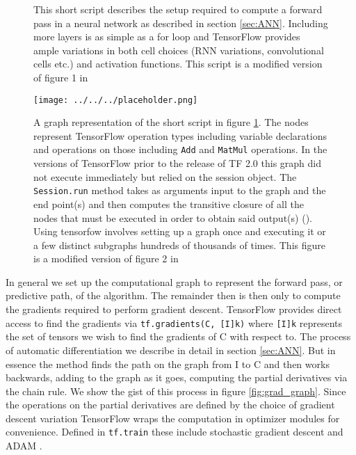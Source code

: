 \begin{figure}[H]
\centering

\caption[FCN forward pass in TensorFlow]{This short script describes the setup required to compute a forward pass in a neural network as described in section \ref{sec:ANN}. Including more layers is as simple as a for loop and TensorFlow provides ample variations in both cell choices (RNN variations, convolutional cells etc.) and activation functions. This script is a modified version of figure 1 in \cite{tensorflow}}\label{fig:graph}
\end{figure}
\begin{figure}
\texttt{[image: ../../../placeholder.png]}
\caption[Graph representation of the forward pass of a simple FCN]{A graph representation of the short script in figure \ref{fig:graph}. The nodes represent TensorFlow operation types including variable declarations and operations on those including \lstinline{Add} and \lstinline{MatMul} operations. In the versions of TensorFlow prior to the release of TF 2.0 this graph did not execute immediately but relied on the session object. The \lstinline{Session.run} method takes as arguments input to the graph and the end point(s) and then computes the transitive closure of all the nodes that must be executed in order to obtain said output(s) (\cite{tensorflow}). Using tensorfow involves setting up a graph once and executing it or a few distinct subgraphs hundreds of thousands of times. This figure is a modified version of figure 2 in \citet{tensorflow}}
\end{figure}

In general we set up the computational graph to represent the forward pass, or predictive path, of the algorithm. The remainder then is then only to compute the gradients required to perform gradient descent. TensorFlow provides direct access to find the gradients via \lstinline{tf.gradients(C, [I]k)} where \lstinline{[I]k} represents the set of tensors we wish to find the gradients of C with respect to. The process of automatic differentiation we describe in detail in section \ref{sec:ANN}. But in essence the method finds the path on the graph from I to C and then works backwards, adding to the graph as it goes, computing the partial derivatives via the chain rule. We show the gist of this process in figure \ref{fig:grad_graph}. Since the operations on the partial derivatives are defined by the choice of gradient descent variation TensorFlow wraps the computation in optimizer modules for convenience. Defined in \lstinline{tf.train} these include stochastic gradient descent and  ADAM . 
 
